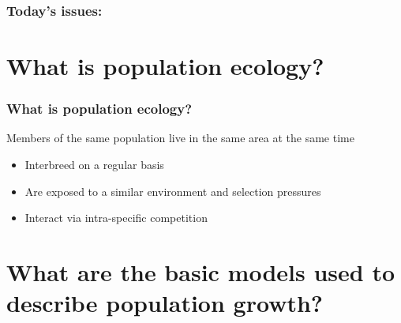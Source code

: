 \begin{noheadline}
\begin{frame}
\frametitle{Today's issues:}
\vspace{5mm}
\tableofcontents
\end{frame}
\end{noheadline}

\section{What is population ecology?}

\begin{frame}
    \frametitle{What is population ecology?}
    \begin{adjustwidth}{-2em}{-1.5em}
        Members of the same population live in the same area at the
        same time

        \begin{itemize}
            \item Interbreed on a regular basis

                \vspace{5mm}
            \item Are exposed to a similar environment and selection pressures

                \vspace{5mm}
            \item Interact via intra-specific competition
        \end{itemize}
    \end{adjustwidth}
\end{frame}

\section[Basic models of population growth]{What are the basic models used to describe population growth?}

